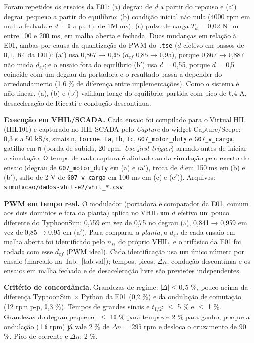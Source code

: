 \documentclass[10pt,a4paper]{article}
\newcommand{\R}[1]{\FloatBarrier\par\medskip\noindent{\large\bfseries #1}\par\smallskip}
\begin{document}
\R{R3. Validação contra o domínio original}
Foram repetidos os ensaios da E01: (a) degrau de $d$ a partir do repouso e (a$'$) degrau pequeno a partir do equilíbrio; (b) condição inicial não nula (4000 rpm em malha fechada e $d=0$ a partir de 150 ms); (c) pulso de carga $T_d$ = 0,02 N·m entre 100 e 200 ms, em malha aberta e fechada. Duas mudanças em relação à E01, ambas por causa da quantização do PWM do \texttt{.tse} ($d$ efetivo em passos de 0,1, R4 da E01): (a$'$) usa 0,867 → 0,95 ($d_{ef}$ 0,85 → 0,95), porque 0,867 → 0,887 não muda $d_{ef}$; e o ensaio fora do equilíbrio (b$'$) usa $d$ = 0,55, porque $d$ = 0,5 coincide com um degrau da portadora e o resultado passa a depender do arredondamento (1,6 \% de diferença entre implementações). Como o sistema é não linear, (a), (b) e (b$'$) validam longe do equilíbrio: partida com pico de 6,4 A, desaceleração de Riccati e condução descontínua.

\textbf{Execução em VHIL/SCADA.} Cada ensaio foi compilado para o Virtual HIL (HIL101) e capturado no HIL SCADA pelo \emph{Capture} do widget Capture/Scope: 0,3 s a 50 kS/s, sinais \texttt{n}, \texttt{torque}, \texttt{Ia}, \texttt{Ib}, \texttt{Ic}, \texttt{G07\_motor\_duty} e \texttt{G07\_v\_carga}, gatilho em \texttt{n} (borda de subida, 20 rpm, \emph{Use first trigger}) armado antes de iniciar a simulação. O tempo de cada captura é alinhado ao da simulação pelo evento do ensaio (degrau de \texttt{G07\_motor\_duty} em (a) e (a$'$), troca de $d$ em 150 ms em (b) e (b$'$), salto de 2 V de \texttt{G07\_v\_carga} em 100 ms em (c) e (c$'$)). Arquivos: \texttt{simulacao/dados-vhil-e2/vhil\_*.csv}.

\textbf{PWM em tempo real.} O modulador (portadora e comparador da E01, comum aos dois domínios e fora da planta) aplica no VHIL um $d$ efetivo um pouco diferente do TyphoonSim: 0,759 em vez de 0,75 no degrau (a), 0,841 → 0,959 em vez de 0,85 → 0,95 em (a$'$). Para comparar a \emph{planta}, o $d_{ef}$ de cada ensaio em malha aberta foi identificado pelo $n_{ss}$ do próprio VHIL, e o trifásico da E01 foi rodado com esse $d_{ef}$ (PWM ideal). Cada identificação usa um único número por ensaio (marcado na Tab.~\ref{tab:val}); tempos, picos, $\Delta n$, condução descontínua e os ensaios em malha fechada e de desaceleração livre são previsões independentes.

\textbf{Critério de concordância.} Grandezas de regime: $|\Delta|\le0{,}5$ \%, pouco acima da diferença TyphoonSim × Python da E01 (0,2 \%) e da ondulação de comutação (12 rpm p-p, 0,3 \%). Tempos de grandes sinais e $t_{1/2}$: $\le$ 5 \% e $\le$ 1 \%. Grandezas do degrau pequeno: $\le$ 10 \% para tempos e 2 \% para ganho, porque a ondulação (±6 rpm) já vale 2 \% de $\Delta n$ = 296 rpm e desloca o cruzamento de 90 \%. Pico de corrente e $\Delta n$: 2 \%.
\end{document}
